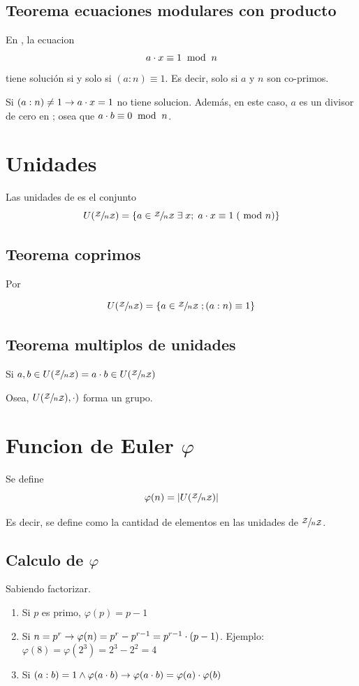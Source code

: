 \documentclass[12pt,a4paper]{report}
\begin{document}
\subsection{Teorema ecuaciones modulares con producto}
\label{sec:teorema-coprimos-ecuaciones}
En \cuerpo, la ecuacion $$a \cdot x \equiv 1 \; \bmod \; {{n}}$$ tiene solución si y solo si $(a : n) \equiv 1$. Es decir, solo si $a$ y $n$ son co-primos.


Si $(a:n) \neq 1 \rightarrow a \cdot x = 1$ no tiene solucion. Además, en este caso, $a$ es un divisor de cero en \cuerpo; osea que $a \cdot b \equiv 0 \; \bmod \; {{n}}$.

\section{Unidades}

Las unidades de \cuerpo es el conjunto
$$
U(\sfrac{\mathcal{{Z}}}{n \mathcal{{Z}}}) = \{a \in \sfrac{\mathcal{{Z}}}{n \mathcal{{Z}}} \; \exists \; x ; \; a \cdot x \equiv 1 \; (\; \bmod \; {{n}})\}
$$

\subsection{Teorema coprimos}
Por 

$$
U(\sfrac{\mathcal{{Z}}}{n \mathcal{{Z}}}) = \{a \in \sfrac{\mathcal{{Z}}}{n \mathcal{{Z}}} \; ; (a: n) \equiv 1\}
$$

\subsection{Teorema multiplos de unidades}
Si $a, b \in U(\sfrac{\mathcal{{Z}}}{n \mathcal{{Z}}}) = a \cdot b \in U(\sfrac{\mathcal{{Z}}}{n \mathcal{{Z}}})$

Osea, $ U(\sfrac{\mathcal{{Z}}}{n \mathcal{{Z}}}), \cdot) $ forma un grupo.


\section{Funcion de Euler $\varphi$}

Se define $$\varphi(n) = | U(\sfrac{\mathcal{{Z}}}{n \mathcal{{Z}}})|$$

Es decir, se define como la cantidad de elementos en las unidades de $\sfrac{\mathcal{{Z}}}{n \mathcal{{Z}}}$.

\subsection{Calculo de $\varphi$}
Sabiendo factorizar.

\begin{enumerate}
    \item{Si $p$ es primo, $\varphi(p) = p - 1$}
    \item{Si $n = p^r \rightarrow \varphi(n) = p^r - p^{r-1} =p^{r-1} \cdot (p-1)$}. Ejemplo: $\varphi(8) = \varphi(2^3) = 2^3 - 2^2 = 4$
    \item{Si $(a:b) = 1 \land \varphi(a \cdot b) \rightarrow \varphi(a \cdot b) =  \varphi(a) \cdot \varphi(b) $}
\end{enumerate}
\end{document}
